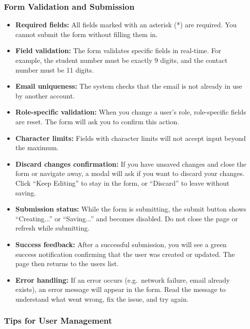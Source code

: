 \documentclass[12pt, a4paper]{article}
\begin{document}
\subsubsection{Form Validation and Submission}

\begin{itemize}
  \item \textbf{Required fields:} All fields marked with an asterisk (*) are required. You cannot submit the form without filling them in.
  \item \textbf{Field validation:} The form validates specific fields in real-time. For example, the student number must be exactly 9 digits, and the contact number must be 11 digits.
  \item \textbf{Email uniqueness:} The system checks that the email is not already in use by another account.
  \item \textbf{Role-specific validation:} When you change a user's role, role-specific fields are reset. The form will ask you to confirm this action.
  \item \textbf{Character limits:} Fields with character limits will not accept input beyond the maximum.
  \item \textbf{Discard changes confirmation:} If you have unsaved changes and close the form or navigate away, a modal will ask if you want to discard your changes. Click ``Keep Editing'' to stay in the form, or ``Discard'' to leave without saving.
  \item \textbf{Submission status:} While the form is submitting, the submit button shows ``Creating...'' or ``Saving...'' and becomes disabled. Do not close the page or refresh while submitting.
  \item \textbf{Success feedback:} After a successful submission, you will see a green success notification confirming that the user was created or updated. The page then returns to the users list.
  \item \textbf{Error handling:} If an error occurs (e.g.\ network failure, email already exists), an error message will appear in the form. Read the message to understand what went wrong, fix the issue, and try again.
\end{itemize}

\subsubsection{Tips for User Management}
\end{document}
